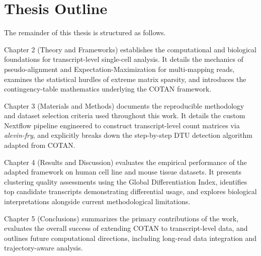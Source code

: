 \section{Thesis Outline}
The remainder of this thesis is structured as follows.

Chapter 2 (Theory and Frameworks) establishes the computational and biological foundations for transcript-level single-cell analysis. It details the mechanics of pseudo-alignment and Expectation-Maximization for multi-mapping reads, examines the statistical hurdles of extreme matrix sparsity, and introduces the contingency-table mathematics underlying the COTAN framework.

Chapter 3 (Materials and Methods) documents the reproducible methodology and dataset selection criteria used throughout this work. It details the custom Nextflow pipeline engineered to construct transcript-level count matrices via \textit{alevin-fry}, and explicitly breaks down the step-by-step DTU detection algorithm adapted from COTAN.

Chapter 4 (Results and Discussion) evaluates the empirical performance of the adapted framework on human cell line and mouse tissue datasets. It presents clustering quality assessments using the Global Differentiation Index, identifies top candidate transcripts demonstrating differential usage, and explores biological interpretations alongside current methodological limitations.

Chapter 5 (Conclusions) summarizes the primary contributions of the work, evaluates the overall success of extending COTAN to transcript-level data, and outlines future computational directions, including long-read data integration and trajectory-aware analysis.
